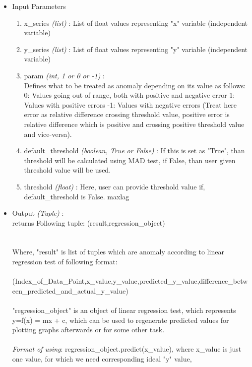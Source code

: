 \begin{itemize}
 \item Input Parameters
 
 \begin{enumerate}
  \item x\_series \textit{(list)} : List of float values representing "x" variable (independent variable)
  \item y\_series \textit{(list)} : List of float values representing "y" variable (independent variable)
  \item param \textit{(int, 1 or 0 or -1)} : \\
  		Defines what to be treated as anomaly depending on its value as follows:
        0: Values going out of range, both with positive and negative error
        1: Values with positive errors
        -1: Values with negative errors
        (Treat here error as relative difference crossing threshold value, positive error is relative difference which is positive and crossing positive threshold value and vice-versa).
  \item default\_threshold \textit{(boolean, True or False)} : If this is set as "True", than threshold will be calculated using MAD test, if False, than user given threshold value will be used.
  \item threshold \textit{(float)} : Here, user can provide threshold value if, default\_threshold is False.
maxlag
 \end{enumerate}

 \item Output \textit{(Tuple)} : \\
 	returns Following tuple:
  (result,regression\_object) \\
  \\
  \\
  Where, "result" is list of tuples which are anomaly according to linear regression test of following format: \\
	\\  
  (Index\_of\_Data\_Point,x\_value,y\_value,predicted\_y\_value,difference\_between\_predicted\_and\_actual\_y\_value)
  \\
  \\
  "regression\_object" is an object of linear regression test, which represents y=f(x) = mx + c,  which can be used to regenerate predicted values for plotting graphs afterwards or for some other task.
  \\
  \\
  \textit{Format of using}: regression\_object.predict(x\_value), where x\_value is just one value, for which we need corresponding ideal "y" value, 
 
\end{itemize}

